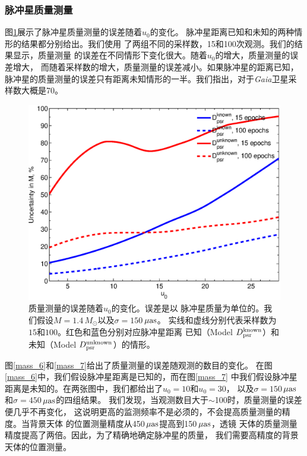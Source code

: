 \subsubsection{脉冲星质量测量}


图\ref{mass_u0}展示了脉冲星质量测量的误差随着$u_0$的变化。
脉冲星距离已知和未知的两种情形的结果都分别给出。我们使用
了两组不同的采样数，15和100次观测。我们的结果显示，质量测量
的误差在不同情形下变化很大。随着$u_0$的增大，质量测量的误差增大，
而随着采样数的增大，质量测量的误差减小。如果脉冲星的距离已知，
脉冲星的质量测量的误差只有距离未知情形的一半。我们指出，对于\textit{Gaia}卫星采样数大概是70\supercite{DeBruijne12}。
%
\begin{figure}
\begin{center}
  \includegraphics[width=4 in,trim=0 0 0 3.2cm]{u0_mass.eps}
%
\caption{质量测量的误差随着$u_0$的变化。误差是以
脉冲星质量为单位的。我们假设$M=1.4$\,$M_{\odot}$以及$\sigma=150$\,$\rm{\mu as}$。
实线和虚线分别代表采样数为$15$和$100$。红色和蓝色分别对应脉冲星距离
已知（Model $D_{\rm{psr}}^{\rm{known}}$）和未知（Model $D_{\rm{psr}}^{\rm{unknown}}$）的情形。
}
\label{mass_u0}
\end{center}
\end{figure}

图\ref{mass_6}和\ref{mass_7}给出了质量测量的误差随观测的数目的变化。
在图\ref{mass_6}中，我们假设脉冲星距离是已知的，而在图\ref{mass_7}
中我们假设脉冲星距离是未知的。在两张图中，我们都给出了$u_0=10$和$u_0=30$，
以及$\sigma=150$\,$\rm{\mu as}$和$\sigma=450$\,$\rm{\mu as}$的四组结果。
我们发现，当观测数目大于$\sim$100时，质量测量的误差便几乎不再变化，
这说明更高的监测频率不是必须的，不会提高质量测量的精度。当背景天体
的位置测量精度从450\,$\rm{\mu as}$提高到150\,$\rm{\mu as}$，透镜
天体的质量测量精度提高了两倍。因此，为了精确地确定脉冲星的质量，
我们需要高精度的背景天体的位置测量。

